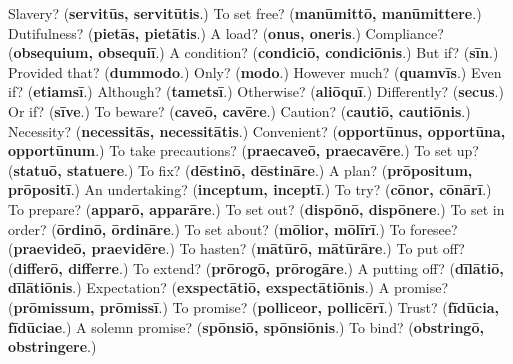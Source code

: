 \begin{tcolorbox}[breakable,colback=teal!4,colframe=teal!35!black,title={Before you move on}]
Slavery? (\textbf{servitūs, servitūtis}.) To set free? (\textbf{manūmittō, manūmittere}.) Dutifulness? (\textbf{pietās, pietātis}.) A load? (\textbf{onus, oneris}.) Compliance? (\textbf{obsequium, obsequiī}.) A condition? (\textbf{condiciō, condiciōnis}.) But if? (\textbf{sīn}.) Provided that? (\textbf{dummodo}.) Only? (\textbf{modo}.) However much? (\textbf{quamvīs}.) Even if? (\textbf{etiamsī}.) Although? (\textbf{tametsī}.) Otherwise? (\textbf{aliōquī}.) Differently? (\textbf{secus}.) Or if? (\textbf{sīve}.) To beware? (\textbf{caveō, cavēre}.) Caution? (\textbf{cautiō, cautiōnis}.) Necessity? (\textbf{necessitās, necessitātis}.) Convenient? (\textbf{opportūnus, opportūna, opportūnum}.) To take precautions? (\textbf{praecaveō, praecavēre}.) To set up? (\textbf{statuō, statuere}.) To fix? (\textbf{dēstinō, dēstināre}.) A plan? (\textbf{prōpositum, prōpositī}.) An undertaking? (\textbf{inceptum, inceptī}.) To try? (\textbf{cōnor, cōnārī}.) To prepare? (\textbf{apparō, apparāre}.) To set out? (\textbf{dispōnō, dispōnere}.) To set in order? (\textbf{ōrdinō, ōrdināre}.) To set about? (\textbf{mōlior, mōlīrī}.) To foresee? (\textbf{praevideō, praevidēre}.) To hasten? (\textbf{mātūrō, mātūrāre}.) To put off? (\textbf{differō, differre}.) To extend? (\textbf{prōrogō, prōrogāre}.) A putting off? (\textbf{dīlātiō, dīlātiōnis}.) Expectation? (\textbf{exspectātiō, exspectātiōnis}.) A promise? (\textbf{prōmissum, prōmissī}.) To promise? (\textbf{polliceor, pollicērī}.) Trust? (\textbf{fīdūcia, fīdūciae}.) A solemn promise? (\textbf{spōnsiō, spōnsiōnis}.) To bind? (\textbf{obstringō, obstringere}.)
\end{tcolorbox}
